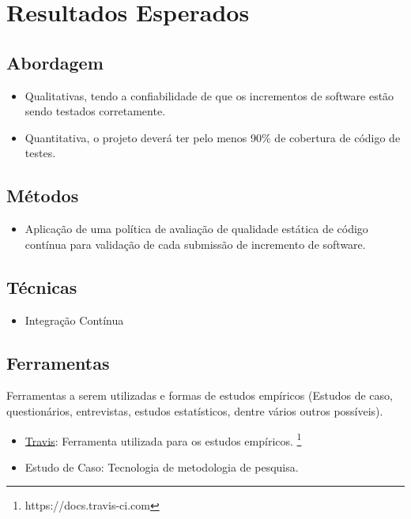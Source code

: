 \section{Resultados Esperados}
\subsection{Abordagem}
\begin{itemize}
    \item Qualitativas, tendo a confiabilidade de que os incrementos de software estão sendo testados corretamente.
    \item Quantitativa, o projeto deverá ter pelo menos 90\% de cobertura de código de testes.
\end{itemize}

\subsection{Métodos}
\begin{itemize}
    \item Aplicação de uma política de avaliação de qualidade estática de código contínua para validação de cada submissão de incremento de software.
\end{itemize}

\subsection{Técnicas}
\begin{itemize}
    \item Integração Contínua
\end{itemize}

\subsection{Ferramentas}
Ferramentas a serem utilizadas e formas de estudos empíricos (Estudos de caso, questionários, entrevistas, estudos estatísticos, dentre vários outros possíveis).
\begin{itemize}
    \item \href{https://docs.travis-ci.com}{Travis}: Ferramenta utilizada para os estudos empíricos.
    \footnote{https://docs.travis-ci.com}
    \item Estudo de Caso: Tecnologia de metodologia de pesquisa.
\end{itemize}
